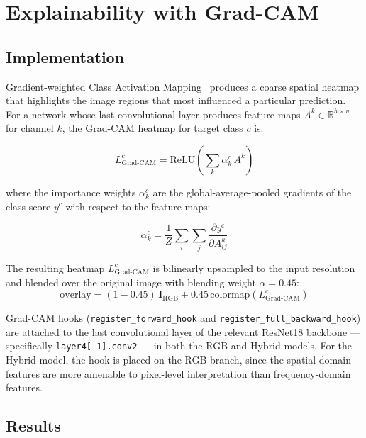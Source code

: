 \documentclass[12pt, a4paper]{article}
\begin{document}
\section{Explainability with Grad-CAM}
\label{sec:gradcam}

\subsection{Implementation}

Gradient-weighted Class Activation Mapping~\cite{selvaraju2017gradcam}
produces a coarse spatial heatmap that highlights the image regions that most
influenced a particular prediction.  For a network whose last convolutional
layer produces feature maps $A^k \in \mathbb{R}^{h \times w}$ for channel
$k$, the Grad-CAM heatmap for target class $c$ is:

\begin{equation}
  L^c_{\text{Grad-CAM}} = \text{ReLU}\!\left(
    \sum_k \alpha_k^c \, A^k
  \right)
  \label{eq:gradcam}
\end{equation}

where the importance weights $\alpha_k^c$ are the global-average-pooled
gradients of the class score $y^c$ with respect to the feature maps:

\begin{equation}
  \alpha_k^c = \frac{1}{Z}\sum_{i}\sum_{j}
    \frac{\partial y^c}{\partial A^k_{ij}}
  \label{eq:gradcam_weights}
\end{equation}

The resulting heatmap $L^c_{\text{Grad-CAM}}$ is bilinearly upsampled to the
input resolution and blended over the original image with blending weight
$\alpha = 0.45$:
\[
  \text{overlay} =
    (1-0.45)\,\mathbf{I}_{\text{RGB}} + 0.45\,\text{colormap}(L^c_{\text{Grad-CAM}})
\]

Grad-CAM hooks (\texttt{register\_forward\_hook} and
\texttt{register\_full\_backward\_hook}) are attached to the last convolutional
layer of the relevant ResNet18 backbone — specifically
\texttt{layer4[-1].conv2} — in both the RGB and Hybrid models.  For the Hybrid
model, the hook is placed on the RGB branch, since the spatial-domain features
are more amenable to pixel-level interpretation than frequency-domain features.

\subsection{Results}
\end{document}
